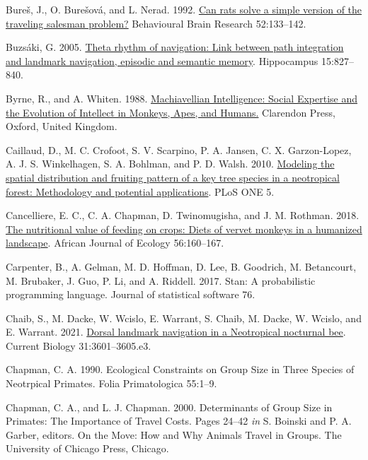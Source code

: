 \documentclass[twoside,12pt,final]{ucthesis-CA2012}
\newenvironment{CSLReferences}%
  {}%
  {\par}
\begin{document}
\begin{ucmainmatter}
\begin{CSLReferences}{1}{0}
\leavevmode{}%
Bureš, J., O. Burešová, and L. Nerad. 1992. \href{https://doi.org/10.1016/S0166-4328(05)80223-2}{Can rats solve a simple version of the traveling salesman problem?} Behavioural Brain Research 52:133--142.

\leavevmode{}%
Buzsáki, G. 2005. \href{https://doi.org/10.1002/hipo.20113}{Theta rhythm of navigation: Link between path integration and landmark navigation, episodic and semantic memory}. Hippocampus 15:827--840.

\leavevmode{}%
Byrne, R., and A. Whiten. 1988. \href{https://doi.org/10.2307/2804121}{Machiavellian Intelligence: Social Expertise and the Evolution of Intellect in Monkeys, Apes, and Humans.} Clarendon Press, Oxford, United Kingdom.

\leavevmode{}%
Caillaud, D., M. C. Crofoot, S. V. Scarpino, P. A. Jansen, C. X. Garzon-Lopez, A. J. S. Winkelhagen, S. A. Bohlman, and P. D. Walsh. 2010. \href{https://doi.org/10.1371/journal.pone.0015002}{Modeling the spatial distribution and fruiting pattern of a key tree species in a neotropical forest: Methodology and potential applications}. PLoS ONE 5.

\leavevmode{}%
Cancelliere, E. C., C. A. Chapman, D. Twinomugisha, and J. M. Rothman. 2018. \href{https://doi.org/10.1111/aje.12496}{The nutritional value of feeding on crops: Diets of vervet monkeys in a humanized landscape}. African Journal of Ecology 56:160--167.

\leavevmode{}%
Carpenter, B., A. Gelman, M. D. Hoffman, D. Lee, B. Goodrich, M. Betancourt, M. Brubaker, J. Guo, P. Li, and A. Riddell. 2017. Stan: A probabilistic programming language. Journal of statistical software 76.

\leavevmode{}%
Chaib, S., M. Dacke, W. Wcislo, E. Warrant, S. Chaib, M. Dacke, W. Wcislo, and E. Warrant. 2021. \href{https://doi.org/10.1016/j.cub.2021.05.029}{Dorsal landmark navigation in a Neotropical nocturnal bee}. Current Biology 31:3601--3605.e3.

\leavevmode{}%
Chapman, C. A. 1990. Ecological Constraints on Group Size in Three Species of Neotrpical Primates. Folia Primatologica 55:1--9.

\leavevmode{}%
Chapman, C. A., and L. J. Chapman. 2000. Determinants of Group Size in Primates: The Importance of Travel Costs. Pages 24--42 \emph{in} S. Boinski and P. A. Garber, editors. On the Move: How and Why Animals Travel in Groups. The University of Chicago Press, Chicago.


\end{CSLReferences}
\end{ucmainmatter}
\end{document}
